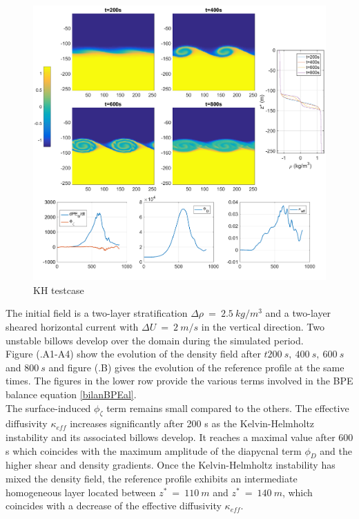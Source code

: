 \begin{figure}[h!]
\centering
\includegraphics[width=1\textwidth]{./CHAP_BPE/Fig_KH2.png}
\caption{KH testcase}
\label{figCkh}
\end{figure}
The initial field is a two-layer stratification  $\Delta \rho\  =\ 2.5\ kg/m^3$ and a two-layer sheared horizontal current with $\Delta U\ =\ 2\ m/s$ in the vertical direction. Two unstable billows develop over the domain during the simulated period.\\
Figure (.A1-A4) show the evolution of the density field after $t200\ s,\ 400\ s,\ 600\ s$ and $800\ s$ and figure (.B) gives the evolution of the reference profile at the same times. The figures in the lower row provide the various terms involved in the BPE balance equation \ref{bilanBPEal}.\\
The surface-induced $\phi_{\zeta}$ term remains small compared to the others. The effective diffusivity $\kappa_{eff}$ increases significantly after 200 s as the Kelvin-Helmholtz instability and its associated billows develop. It reaches a maximal value after 600 s which coincides with the maximum amplitude of the diapycnal term $\phi_D$ and the higher shear and density gradients.
Once the Kelvin-Helmholtz instability has mixed the density field, the reference profile exhibits an intermediate homogeneous layer located between $z^*\ =\ 110\ m$ and $z^*\ =\ 140\ m$, which coincides with a decrease of the effective diffusivity $\kappa_{eff}$.

